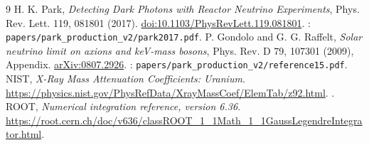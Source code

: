 \begin{thebibliography}{9}
H. K. Park, \emph{Detecting Dark Photons with Reactor Neutrino Experiments}, Phys. Rev. Lett. 119, 081801 (2017). \href{https://doi.org/10.1103/PhysRevLett.119.081801}{doi:10.1103/PhysRevLett.119.081801}. : \texttt{papers/park\_production\_v2/park2017.pdf}.
P. Gondolo and G. G. Raffelt, \emph{Solar neutrino limit on axions and keV-mass bosons}, Phys. Rev. D 79, 107301 (2009), Appendix. \href{https://arxiv.org/abs/0807.2926}{arXiv:0807.2926}. : \texttt{papers/park\_production\_v2/reference15.pdf}.
NIST, \emph{X-Ray Mass Attenuation Coefficients: Uranium}. \url{https://physics.nist.gov/PhysRefData/XrayMassCoef/ElemTab/z92.html}. .
ROOT, \emph{Numerical integration reference, version 6.36}. \url{https://root.cern.ch/doc/v636/classROOT_1_1Math_1_1GaussLegendreIntegrator.html}.
\end{thebibliography}

